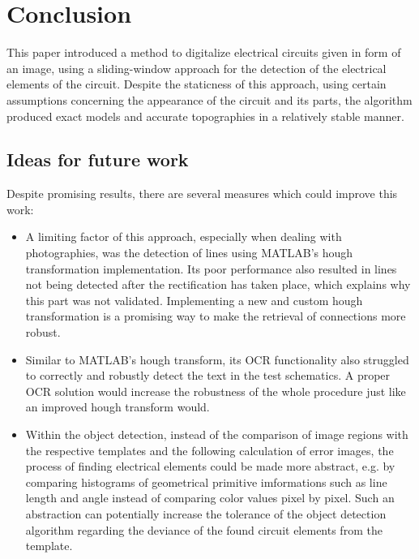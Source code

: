 \documentclass[10pt,twocolumn,letterpaper]{article}
\begin{document}

\section{Conclusion}

This paper introduced a method to digitalize electrical circuits given in form of an image, using a sliding-window approach for the detection of the electrical elements of the circuit. Despite the staticness of this approach, using certain assumptions concerning the appearance of the circuit and its parts, the algorithm produced exact models and accurate topographies in a relatively stable manner.

\subsection*{Ideas for future work}

Despite promising results, there are several measures which could improve this work:
\begin{itemize}
	\item A limiting factor of this approach, especially when dealing with photographies, was the detection of lines using MATLAB's hough transformation implementation. Its poor performance also resulted in lines not being detected after the rectification has taken place, which explains why this part was not validated. Implementing a new and custom hough transformation is a promising way to make the retrieval of connections more robust.
	\item Similar to MATLAB's hough transform, its OCR functionality also struggled to correctly and robustly detect the text in the test schematics. A proper OCR solution would increase the robustness of the whole procedure just like an improved hough transform would.
	\item Within the object detection, instead of the comparison of image regions with the respective templates and the following calculation of error images, the process of finding electrical elements could be made more abstract, e.g. by comparing histograms of geometrical primitive imformations such as line length and angle instead of comparing color values pixel by pixel. Such an abstraction can potentially increase the tolerance of the object detection algorithm regarding the deviance of the found circuit elements from the template.
\end{itemize}
\end{document}
